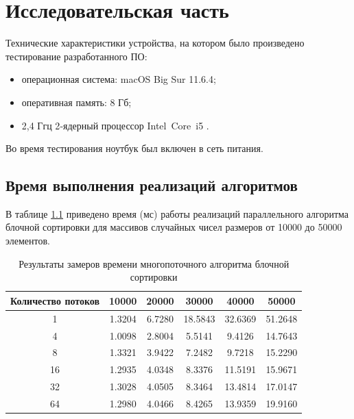 \chapter{Исследовательская часть}

Технические характеристики устройства, на котором было произведено тестирование разработанного ПО: 

\begin{itemize}
	\item операционная система: macOS Big Sur 11.6.4;
	\item оперативная память: 8 Гб;
	\item 2,4 Ггц 2‑ядерный процессор Intel Core i5 \cite{intel}.
\end{itemize}

Во время тестирования ноутбук был включен в сеть питания.

\section{Время выполнения реализаций алгоритмов}

В таблице \ref{tab:time1} приведено время (мс) работы реализаций параллельного алгоритма блочной сортировки для массивов случайных чисел размеров от 10000 до 50000 элементов. 

\begin{table}[h]
	\begin{center}
		\caption{\label{tab:time1}Результаты замеров времени многопоточного алгоритма блочной сортировки}
		\begin{tabular}{|c|c|c|c|c|c|}
		\hline
		Количество потоков & 10000 &  20000  & 30000 & 40000 & 50000 \\
		\hline
		1  & 1.3204 & 6.7280 & 18.5843 & 32.6369 & 51.2648 \\
		\hline
		4  & 1.0098  & 2.8004 & 5.5141 & 9.4126 & 14.7643  \\
		\hline
		8  & 1.3321 & 3.9422 & 7.2482 & 9.7218 & 15.2290 \\
		\hline
		16  & 1.2935 & 4.0348 & 8.3376 & 11.5191 & 15.9671 \\
		\hline
		32  & 1.3028 & 4.0505 & 8.3464 & 13.4814 & 17.0147 \\
		\hline
		64  & 1.2980 & 4.0466 & 8.4265 & 13.9359 & 19.9160 \\
		\hline
		\end{tabular}
	\end{center}
\end{table}

